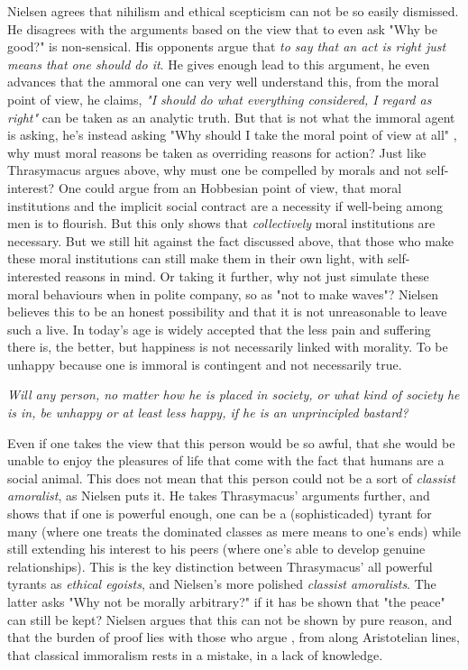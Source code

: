 \documentclass[english,course]{Notes}
\newcommand{\ita}[1]{\textit{#1}}
\newcommand\quo[1]{\begin{displayquote}\ita{\large{#1}}\end{displayquote}}
\begin{document}
{{\par{Nielsen agrees that nihilism and ethical scepticism can not be so easily dismissed. He disagrees with the arguments based on the view that to even ask "Why be good?" is non-sensical. His opponents argue that \ita{to say that an act is right just means that one should do it}. He gives enough lead to this argument, he even advances that the ammoral one can very well understand this, from the moral point of view, he claims, \ita{"I should do what everything considered, I regard as right"} can be taken as an analytic truth. But that is not what the immoral agent is asking, he's instead asking "Why should I take the moral point of view at all" , why must moral reasons be taken as overriding reasons for action? Just like Thrasymacus argues above, why must one be compelled by morals and not self-interest? One could argue from an Hobbesian point of view, that moral institutions and the implicit social contract are a necessity if well-being among men is to flourish.   But this only shows that \ita{collectively} moral institutions are necessary. But we still hit against the fact discussed above, that those who make these moral institutions can still make them in their own light, with self-interested reasons in mind. Or taking it further, why not just simulate these moral behaviours when in polite company, so as "not to make waves"? Nielsen believes this to be an honest possibility and that it is not unreasonable to leave such a live. In today's age is widely accepted that the less pain and suffering there is, the better, but happiness is not necessarily linked with morality. To be unhappy because one is immoral is contingent and not necessarily true. 

\quo{Will any person, no matter how he is placed in society, or what kind of society he is in, be unhappy or at least less happy, if he is an unprincipled bastard?}

Even if one takes the view that this person would be so awful, that she would be unable to enjoy the pleasures of life that come with the fact that humans are a social animal. This does not mean that this person could not be a sort of \ita{classist amoralist}, as Nielsen puts it. He takes Thrasymacus' arguments further, and shows that if one is powerful enough, one can be a (sophisticaded) tyrant for many (where one treats the dominated classes as mere means to one's ends) while still extending his interest to his peers (where one's able to develop genuine relationships). This is the key distinction between Thrasymacus' all powerful tyrants as \ita{ethical egoists}, and Nielsen's more polished \ita{classist amoralists}. The latter asks "Why not be morally arbitrary?" if it has be shown that "the peace" can still be kept? Nielsen argues that this can not be shown by pure reason, and that the burden of proof lies with those who argue , from along Aristotelian lines, that classical immoralism rests in a mistake, in a lack of knowledge.


}}}
\end{document}
